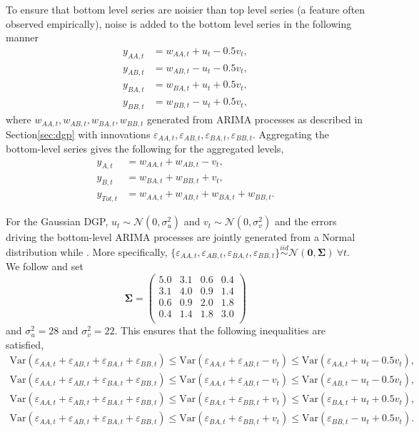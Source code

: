 \documentclass[12pt]{article}
\def\var{\text{Var}}
\theoremstyle{definition}
\begin{document}
To ensure that bottom level series are noisier than top level series (a feature often observed empirically), noise is added to the bottom level series in the following manner
\begin{align*}
y_{AA,t} &= w_{AA,t} + u_t - 0.5v_t,\\
y_{AB,t} &= w_{AB,t} - u_t - 0.5v_t,\\
y_{BA,t} &= w_{BA,t} + u_t + 0.5v_t,\\
y_{BB,t} &= w_{BB,t} - u_t + 0.5v_t,
\end{align*}
where $w_{AA,t},w_{AB,t},w_{BA,t},w_{BB,t}$ generated from ARIMA processes as described in Section\ref{sec:dgp} with innovations $\varepsilon_{AA,t},\varepsilon_{AB,t},\varepsilon_{BA,t},\varepsilon_{BB,t}$. Aggregating the bottom-level series gives the following for the aggregated levels,
\begin{align*}
y_{A,t} &= w_{AA,t} + w_{AB,t} - v_t,\\
y_{B,t} &= w_{BA,t} + w_{BB,t} + v_t,\\
y_{Tot,t} &= w_{AA,t} + w_{AB,t} + w_{BA,t} + w_{BB,t}.
\end{align*}


For the Gaussian DGP, $u_t \sim \mathcal{N}(0,\sigma^2_u)$ and $v_t \sim \mathcal{N}(0,\sigma^2_v)$ and the errors driving the bottom-level ARIMA processes are jointly generated from a Normal distribution while . More specifically, $\{\varepsilon_{AA,t},\varepsilon_{AB,t},\varepsilon_{BA,t},\varepsilon_{BB,t}\} \overset{iid}{\sim} \mathcal{N}(\bm{0}, \bm{\Sigma})~\forall t$.  We follow \cite{WicEtAl2019} and set
\begin{equation*}\label{eq:SigmaGaussian}
\bm{\Sigma} =
\begin{pmatrix}
5.0 & 3.1 & 0.6 & 0.4 \\
3.1 & 4.0 & 0.9 & 1.4 \\
0.6 & 0.9 & 2.0 & 1.8 \\
0.4 & 1.4 & 1.8 & 3.0 \\
\end{pmatrix}
\end{equation*} and $\sigma^2_u=28$ and $\sigma^2_v=22$. This ensures that the following inequalities are satisfied,
\begin{align*}
\var(\varepsilon_{AA,t} + \varepsilon_{AB,t} + \varepsilon_{BA,t} + \varepsilon_{BB,t})
\le \var(\varepsilon_{AA,t}+\varepsilon_{AB,t}-v_t)
\le \var(\varepsilon_{AA,t}+u_t-0.5v_t),\\
\var(\varepsilon_{AA,t} + \varepsilon_{AB,t} + \varepsilon_{BA,t} + \varepsilon_{BB,t})
\le \var(\varepsilon_{AA,t}+\varepsilon_{AB,t}-v_t)
\le \var(\varepsilon_{AB,t}-u_t-0.5v_t),\\
\var(\varepsilon_{AA,t} + \varepsilon_{AB,t} + \varepsilon_{BA,t} + \varepsilon_{BB,t})
\le \var(\varepsilon_{BA,t}+\varepsilon_{BB,t}+v_t)
\le \var(\varepsilon_{BA,t}+u_t+0.5v_t),\\
\var(\varepsilon_{AA,t} + \varepsilon_{AB,t} + \varepsilon_{BA,t} + \varepsilon_{BB,t})
\le \var(\varepsilon_{BA,t}+\varepsilon_{BB,t}+v_t)
\le \var(\varepsilon_{BB,t}-u_t+0.5v_t).\\
\end{align*}
\end{document}

